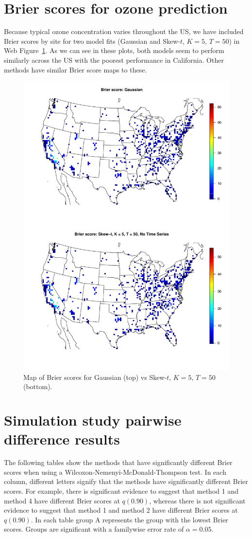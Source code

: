 \documentclass[useAMS,usenatbib,referee]{biomweb}
\renewcommand{\fref}[1]{Web Figure~\ref{#1}}
\begin{document}
\section{Brier scores for ozone prediction} \label{sta:ozonesite}
Because typical ozone concentration varies throughout the US, we have included Brier scores by site for two model fits (Gaussian and Skew-$t$, $K = 5$, $T = 50$) in \fref{stfig:bssite}.
As we can see in these plots, both models seem to perform similarly across the US with the poorest performance in California.
Other methods have similar Brier score maps to these.
\begin{figure}
  \centering
  \includegraphics[width=0.8\linewidth]{plots/bs-site}
  \caption{Map of Brier scores for Gaussian (top) vs Skew-$t$, $K = 5$, $T = 50$ (bottom).}
  \label{stfig:bssite}
\end{figure}

\section{Simulation study pairwise difference results} \label{sta:pdiffs}
The following tables show the methods that have significantly different Brier scores when using a Wilcoxon-Nemenyi-McDonald-Thompson test.
In each column, different letters signify that the methods have significantly different Brier scores.
For example, there is significant evidence to suggest that method 1 and method 4 have different Brier scores at $q(0.90)$, whereas there is not significant evidence to suggest that method 1 and method 2 have different Brier scores at $q(0.90)$.
In each table group A represents the group with the lowest Brier scores.
Groups are significant with a familywise error rate of $\alpha = 0.05$.
\end{document}
